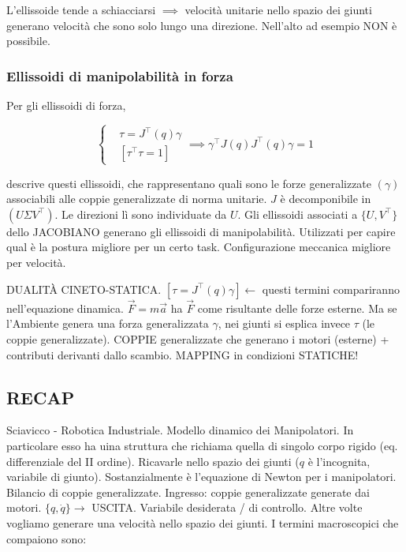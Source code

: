 L'ellissoide tende a schiacciarsi $\implies$ velocità unitarie nello spazio dei giunti generano velocità che sono solo lungo una direzione. Nell'alto ad esempio NON è possibile.

\subsubsection{Ellissoidi di manipolabilità in forza}

Per gli ellissoidi di forza, 

\[
	\left\{
	\begin{aligned}
	&\tau=J^\top(q)\gamma\\
	&[\tau^\top\tau = 1]
	\end{aligned}
	\right.\implies \gamma^\top J(q)J^\top(q)\gamma = 1
\]

descrive questi ellissoidi, che rappresentano quali sono le forze generalizzate $(\gamma)$ associabili alle coppie generalizzate di norma unitarie. $J$ è decomponibile in $(U\Sigma V^\top)$. Le direzioni lì sono individuate da $U$. Gli ellissoidi associati a $\{U,V^\top\}$ dello JACOBIANO generano gli ellissoidi di manipolabilità. Utilizzati per capire qual è la postura migliore per un certo task. Configurazione meccanica migliore per velocità.

DUALIT\`A CINETO-STATICA. $[\tau=J^\top(q)\gamma]\leftarrow$ questi termini compariranno nell'equazione dinamica. $\vec{F}=m\vec{a}$ ha $\vec{F}$ come risultante delle forze esterne. Ma se l'Ambiente genera una forza generalizzata $\gamma$, nei giunti si esplica invece $\tau$ (le coppie generalizzate). COPPIE generalizzate che generano i motori (esterne) + contributi derivanti dallo scambio. MAPPING in condizioni STATICHE!

\subsection{RECAP}

Sciavicco - Robotica Industriale.
Modello dinamico dei Manipolatori. In particolare esso ha uina struttura che richiama quella di singolo corpo rigido (eq. differenziale del II ordine). Ricavarle nello spazio dei giunti ($q$ è l'incognita, variabile di giunto). Sostanzialmente è l'equazione di Newton per i manipolatori. Bilancio di coppie generalizzate. Ingresso: coppie generalizzate generate dai motori. $\{q,\dot{q}\}\rightarrow$ USCITA. Variabile desiderata / di controllo. Altre volte vogliamo generare una velocità nello spazio dei giunti. I termini macroscopici che compaiono sono:

